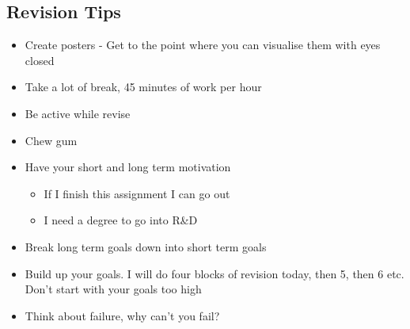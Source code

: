 \documentclass[a4paper, 12pt]{article}
\begin{document}
		\subsection*{Revision Tips}
			\begin{itemize}
				\item Create posters - Get to the point where you can visualise them with eyes closed
				\item Take a lot of break, 45 minutes of work per hour
				\item Be active while revise
				\item Chew gum
				\item Have your short and long term motivation 
				\begin{itemize}
					\item If I finish this assignment I can go out
					\item I need a degree to go into R\&D
				\end{itemize}
				\item Break long term goals down into short term goals
				\item Build up your goals. I will do four blocks of revision today, then 5, then 6 etc. Don't start with your goals too high
				\item Think about failure, why can't you fail?
			\end{itemize}
\end{document}
